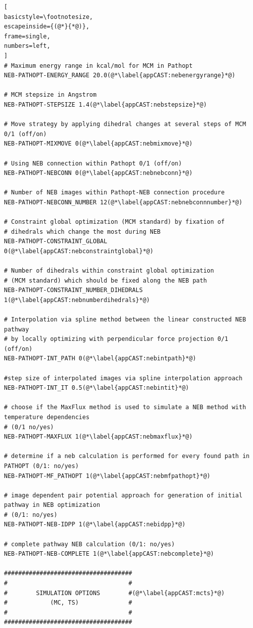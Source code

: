 \documentclass[a4paper,11pt]{scrartcl}
\begin{document}
\begin{lstlisting}[
basicstyle=\footnotesize,
escapeinside={(@*}{*@)},
frame=single,
numbers=left,
]
# Maximum energy range in kcal/mol for MCM in Pathopt
NEB-PATHOPT-ENERGY_RANGE 20.0(@*\label{appCAST:nebenergyrange}*@)

# MCM stepsize in Angstrom
NEB-PATHOPT-STEPSIZE 1.4(@*\label{appCAST:nebstepsize}*@)

# Move strategy by applying dihedral changes at several steps of MCM 0/1 (off/on)
NEB-PATHOPT-MIXMOVE 0(@*\label{appCAST:nebmixmove}*@)

# Using NEB connection within Pathopt 0/1 (off/on) 
NEB-PATHOPT-NEBCONN 0(@*\label{appCAST:nebnebconn}*@)

# Number of NEB images within Pathopt-NEB connection procedure
NEB-PATHOPT-NEBCONN_NUMBER 12(@*\label{appCAST:nebnebconnnumber}*@)

# Constraint global optimization (MCM standard) by fixation of
# dihedrals which change the most during NEB
NEB-PATHOPT-CONSTRAINT_GLOBAL 0(@*\label{appCAST:nebconstraintglobal}*@)

# Number of dihedrals within constraint global optimization 
# (MCM standard) which should be fixed along the NEB path
NEB-PATHOPT-CONSTRAINT_NUMBER_DIHEDRALS 1(@*\label{appCAST:nebnumberdihedrals}*@)

# Interpolation via spline method between the linear constructed NEB pathway
# by locally optimizing with perpendicular force projection 0/1 (off/on) 
NEB-PATHOPT-INT_PATH 0(@*\label{appCAST:nebintpath}*@)

#step size of interpolated images via spline interpolation approach
NEB-PATHOPT-INT_IT 0.5(@*\label{appCAST:nebintit}*@)

# choose if the MaxFlux method is used to simulate a NEB method with temperature dependencies 
# (0/1 no/yes)
NEB-PATHOPT-MAXFLUX 1(@*\label{appCAST:nebmaxflux}*@)

# determine if a neb calculation is performed for every found path in PATHOPT (0/1: no/yes)
NEB-PATHOPT-MF_PATHOPT 1(@*\label{appCAST:nebmfpathopt}*@)

# image dependent pair potential approach for generation of initial pathway in NEB optimization
# (0/1: no/yes)
NEB-PATHOPT-NEB-IDPP 1(@*\label{appCAST:nebidpp}*@)

# complete pathway NEB calculation (0/1: no/yes)
NEB-PATHOPT-NEB-COMPLETE 1(@*\label{appCAST:nebcomplete}*@)

####################################
#                                  #
#        SIMULATION OPTIONS        #(@*\label{appCAST:mcts}*@)
#            (MC, TS)              #
#                                  #
####################################


\end{lstlisting}
\end{document}
